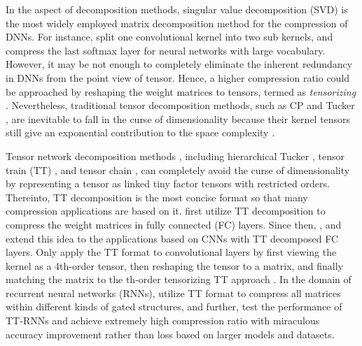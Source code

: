 \documentclass[a4paper,fleqn]{cas-dc}
\begin{document}
In the aspect of decomposition methods, singular value decomposition (SVD) is the most widely employed matrix decomposition method for the compression of DNNs. For instance, \citet{Zhang_2015_SVD,Zhang_2016_SVD} split one convolutional kernel into two sub kernels, and \citet{Shim_2017_SVD} compress the last softmax layer for neural networks with large vocabulary. However, it may be not enough to completely eliminate the inherent redundancy in DNNs \citep{Denil_2013_Redundancy} from the point view  of tensor. Hence, a higher compression ratio could be approached by reshaping the weight matrices to tensors, termed as \emph{tensorizing} \citep{Novikov_2015_TT}. Nevertheless, traditional tensor decomposition methods, such as CP \citep{Caroll_1970_CP} and Tucker \citep{Tucker_1966_Tucker}, are inevitable to fall in the curse of dimensionality because their kernel tensors still give an exponential contribution to the space complexity \citep{Cichocki_2015_TensorApp}.

Tensor network decomposition methods \citep{Cichocki_2018_TensorNetworks}, including hierarchical Tucker \citep{Hackbusch_2009_InventHT,Grasedyck_2010_InventHT}, tensor train (TT) \citep{Oseledets_2011_InventTT}, and tensor chain \citep{Khoromskij_2011_InventTC,Zhao_2018_TR}, can completely avoid the curse of dimensionality   by representing a tensor as linked tiny factor tensors with restricted orders. Thereinto, TT decomposition is the most concise format so that many compression applications are based on it. \citet{Novikov_2015_TT} first utilize TT decomposition to compress the weight matrices in fully connected (FC) layers. Since then, \citet{Huang_2018_TTCNN}, \citet{Su_2018_TTCNN} and \citet{Huang_2019_TTCNN} extend this idea to the applications based on CNNs with TT decomposed FC layers. Only \citet{Garipov_2016_TTCNN} apply the TT format to convolutional layers by first viewing the kernel as a 4th-order tensor, then reshaping the tensor to a matrix, and finally matching the matrix to the th-order tensorizing TT approach \citep{Novikov_2015_TT}. In the domain of recurrent neural networks (RNNs), \citet{Tjandra_2017_TTRNN1,Tjandra_2018_TTRNN2} utilize TT format to compress all matrices within different kinds of gated structures, and further, \citet{Yang_2017_TTRNN} test the performance of TT-RNNs and achieve extremely high compression ratio with miraculous accuracy improvement rather than loss based on larger models and datasets.
\end{document}

